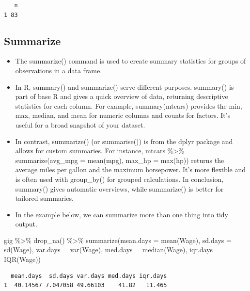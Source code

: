\documentclass[
  letterpaper,
  DIV=11,
  numbers=noendperiod]{scrreprt}
\newenvironment{Shaded}{\begin{snugshade}}{\end{snugshade}}
\newcommand{\AttributeTok}[1]{\textcolor[rgb]{0.40,0.45,0.13}{#1}}
\newcommand{\FunctionTok}[1]{\textcolor[rgb]{0.28,0.35,0.67}{#1}}
\newcommand{\NormalTok}[1]{\textcolor[rgb]{0.00,0.23,0.31}{#1}}
\newcommand{\SpecialCharTok}[1]{\textcolor[rgb]{0.37,0.37,0.37}{#1}}
\providecommand{\tightlist}{%
  \setlength{\itemsep}{0pt}\setlength{\parskip}{0pt}}\usepackage{longtable,booktabs,array}
\begin{document}
\begin{verbatim}
   n
1 83
\end{verbatim}

\subsection{Summarize}\label{summarize}

\begin{itemize}
\tightlist
\item
  The summarize() command is used to create summary statistics for
  groups of observations in a data frame.
\item
  In R, summary() and summarize() serve different purposes. summary() is
  part of base R and gives a quick overview of data, returning
  descriptive statistics for each column. For example, summary(mtcars)
  provides the min, max, median, and mean for numeric columns and counts
  for factors. It's useful for a broad snapshot of your dataset.
\item
  In contrast, summarize() (or summarise()) is from the dplyr package
  and allows for custom summaries. For instance, mtcars \%\textgreater\%
  summarize(avg\_mpg = mean(mpg), max\_hp = max(hp)) returns the average
  miles per gallon and the maximum horsepower. It's more flexible and is
  often used with group\_by() for grouped calculations. In conclusion,
  summary() gives automatic overviews, while summarize() is better for
  tailored summaries.
\item
  In the example below, we can summarize more than one thing into tidy
  output.
\end{itemize}

\begin{Shaded}
\begin{Highlighting}[]
\NormalTok{gig }\SpecialCharTok{\%\textgreater{}\%}
    \FunctionTok{drop\_na}\NormalTok{() }\SpecialCharTok{\%\textgreater{}\%}
    \FunctionTok{summarize}\NormalTok{(}\AttributeTok{mean.days =} \FunctionTok{mean}\NormalTok{(Wage), }\AttributeTok{sd.days =} \FunctionTok{sd}\NormalTok{(Wage), }\AttributeTok{var.days =} \FunctionTok{var}\NormalTok{(Wage),}
        \AttributeTok{med.days =} \FunctionTok{median}\NormalTok{(Wage), }\AttributeTok{iqr.days =} \FunctionTok{IQR}\NormalTok{(Wage))}
\end{Highlighting}
\end{Shaded}

\begin{verbatim}
  mean.days  sd.days var.days med.days iqr.days
1  40.14567 7.047058 49.66103    41.82   11.465
\end{verbatim}
\end{document}
